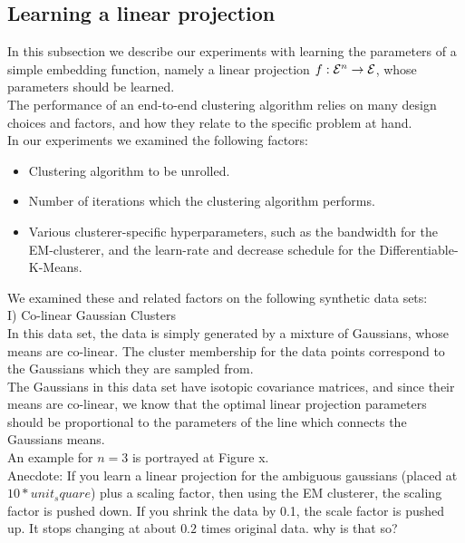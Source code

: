 \subsection{Learning a linear projection}
In this subsection we describe our experiments with learning the parameters of a simple embedding function, namely a linear projection $f:\mathcal{E}^n \rightarrow \mathcal{E}$, whose parameters should be learned.\\
The performance of an end-to-end clustering algorithm relies on many design choices and factors, and how they relate to the specific problem at hand.\\
In our experiments we examined the following factors:\\
\begin{itemize}
\item Clustering algorithm to be unrolled.  
\item Number of iterations which the clustering algorithm performs.
\item Various clusterer-specific hyperparameters, such as the bandwidth for the EM-clusterer, and the learn-rate and decrease schedule for the Differentiable-K-Means. 
\end{itemize}
We examined these and related factors on the following synthetic data sets:\\
I) Co-linear Gaussian Clusters\\
In this data set, the data is simply generated by a mixture of Gaussians, whose means are co-linear. The cluster membership for the data points correspond to the Gaussians which they are sampled from. \\
The Gaussians in this data set have isotopic covariance matrices, and since their means are co-linear, we know that the optimal linear projection parameters should be proportional to the parameters of the line which connects the Gaussians means.\\ %
An example for $n=3$ is portrayed at Figure x.\\
Anecdote: If you learn a linear projection for the ambiguous gaussians (placed at $10*unit_square$) plus a scaling factor, then using the EM clusterer, the scaling factor is pushed down. If you shrink the data by 0.1, the scale factor is pushed up. It stops changing at about $0.2$ times original data. why is that so?
